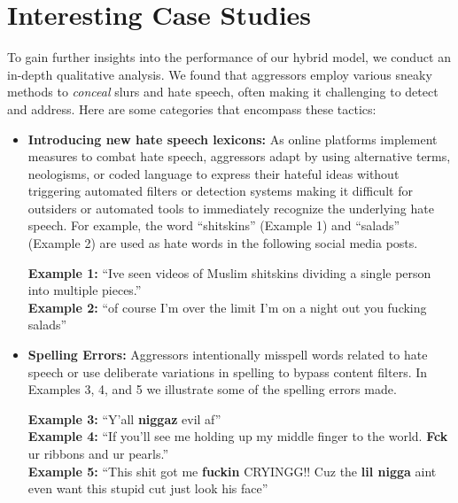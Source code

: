 \section{Interesting Case Studies}
To gain further insights into the performance of our hybrid model, we conduct an in-depth qualitative analysis.
We found that aggressors employ various sneaky methods to \textit{conceal} slurs and hate speech, often making it challenging to detect and address.
Here are some categories that encompass these tactics:
\begin{itemize}[leftmargin=*]
    \item \textbf{Introducing new hate speech lexicons:} As online platforms implement measures to combat hate speech, aggressors adapt by using alternative terms, neologisms, or coded language to express their hateful ideas without triggering automated filters or detection systems making it difficult for outsiders or automated tools to immediately recognize the underlying hate speech. For example, the word ``shitskins'' (Example 1) and ``salads'' (Example 2) are used as hate words in the following social media posts.

    \vspace{0.1in}
    \begin{graybox}
    \textbf{Example 1: }``Ive seen videos of Muslim shitskins dividing a single person into multiple pieces.''\\
    \textbf{Example 2: }``of course I'm over the limit I'm on a night out you fucking salads''
    \end{graybox}
    \vspace{0.1in}

    \item \textbf{Spelling Errors:} Aggressors intentionally misspell words related to hate speech or use deliberate variations in spelling to bypass content filters. In Examples 3, 4, and 5 we illustrate some of the spelling errors made.

    \vspace{0.1in}
    \begin{graybox}
    \textbf{Example 3: }``Y'all \textbf{niggaz} evil af''\\
    \textbf{Example 4: }``If you'll see me holding up my middle finger to the world. \textbf{Fck} ur ribbons and ur pearls.'' \\
    \textbf{Example 5: }``This shit got me \textbf{fuckin} CRYINGG!! Cuz the \textbf{lil nigga} aint even want this stupid cut just look \@ his face''
    \end{graybox}
    \vspace{0.1in}
    

\end{itemize}
